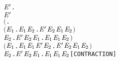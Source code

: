 \begin{alltt}
     \HOLTokenDefEquality{}
     \HOLSymConst{\HOLTokenForall{}} \ensuremath{\HOLBoundVar{E}\sp{\prime}}.
           \ensuremath{\HOLBoundVar{E}\sp{\prime}} \HOLSymConst{\HOLTokenImp{}}
         \ensuremath{(}\HOLSymConst{\HOLTokenForall{}}.
              \ensuremath{(}\HOLSymConst{\HOLTokenForall{}}\ensuremath{\HOLBoundVar{E}\sb{\mathrm{1}}}.  \HOLTokenTransBegin{} \HOLTokenTransEnd \ensuremath{\HOLBoundVar{E}\sb{\mathrm{1}}} \HOLSymConst{\HOLTokenImp{}} \HOLSymConst{\HOLTokenExists{}}\ensuremath{\HOLBoundVar{E}\sb{\mathrm{2}}}. \ensuremath{\HOLBoundVar{E}\sp{\prime}} \HOLTokenTransBegin{} \HOLTokenTransEnd \ensuremath{\HOLBoundVar{E}\sb{\mathrm{2}}} \HOLSymConst{\HOLTokenConj{}}  \ensuremath{\HOLBoundVar{E}\sb{\mathrm{1}}} \ensuremath{\HOLBoundVar{E}\sb{\mathrm{2}}}\ensuremath{)} \HOLSymConst{\HOLTokenConj{}}
              \HOLSymConst{\HOLTokenForall{}}\ensuremath{\HOLBoundVar{E}\sb{\mathrm{2}}}. \ensuremath{\HOLBoundVar{E}\sp{\prime}} \HOLTokenTransBegin{} \HOLTokenTransEnd \ensuremath{\HOLBoundVar{E}\sb{\mathrm{2}}} \HOLSymConst{\HOLTokenImp{}} \HOLSymConst{\HOLTokenExists{}}\ensuremath{\HOLBoundVar{E}\sb{\mathrm{1}}}.  \HOLTokenWeakTransBegin{} \HOLTokenWeakTransEnd \ensuremath{\HOLBoundVar{E}\sb{\mathrm{1}}} \HOLSymConst{\HOLTokenConj{}} \ensuremath{\HOLBoundVar{E}\sb{\mathrm{1}}} \HOLSymConst{\HOLTokenWeakEQ} \ensuremath{\HOLBoundVar{E}\sb{\mathrm{2}}}\ensuremath{)} \HOLSymConst{\HOLTokenConj{}}
         \ensuremath{(}\HOLSymConst{\HOLTokenForall{}}\ensuremath{\HOLBoundVar{E}\sb{\mathrm{1}}}.  \HOLTokenTransBegin\HOLSymConst{\ensuremath{\tau}}\HOLTokenTransEnd \ensuremath{\HOLBoundVar{E}\sb{\mathrm{1}}} \HOLSymConst{\HOLTokenImp{}}  \ensuremath{\HOLBoundVar{E}\sb{\mathrm{1}}} \ensuremath{\HOLBoundVar{E}\sp{\prime}} \HOLSymConst{\HOLTokenDisj{}} \HOLSymConst{\HOLTokenExists{}}\ensuremath{\HOLBoundVar{E}\sb{\mathrm{2}}}. \ensuremath{\HOLBoundVar{E}\sp{\prime}} \HOLTokenTransBegin\HOLSymConst{\ensuremath{\tau}}\HOLTokenTransEnd \ensuremath{\HOLBoundVar{E}\sb{\mathrm{2}}} \HOLSymConst{\HOLTokenConj{}}  \ensuremath{\HOLBoundVar{E}\sb{\mathrm{1}}} \ensuremath{\HOLBoundVar{E}\sb{\mathrm{2}}}\ensuremath{)} \HOLSymConst{\HOLTokenConj{}}
         \HOLSymConst{\HOLTokenForall{}}\ensuremath{\HOLBoundVar{E}\sb{\mathrm{2}}}. \ensuremath{\HOLBoundVar{E}\sp{\prime}} \HOLTokenTransBegin\HOLSymConst{\ensuremath{\tau}}\HOLTokenTransEnd \ensuremath{\HOLBoundVar{E}\sb{\mathrm{2}}} \HOLSymConst{\HOLTokenImp{}} \HOLSymConst{\HOLTokenExists{}}\ensuremath{\HOLBoundVar{E}\sb{\mathrm{1}}}.  \HOLSymConst{\HOLTokenEPS} \ensuremath{\HOLBoundVar{E}\sb{\mathrm{1}}} \HOLSymConst{\HOLTokenConj{}} \ensuremath{\HOLBoundVar{E}\sb{\mathrm{1}}} \HOLSymConst{\HOLTokenWeakEQ} \ensuremath{\HOLBoundVar{E}\sb{\mathrm{2}}}\hfill{[CONTRACTION]}


\end{alltt}

